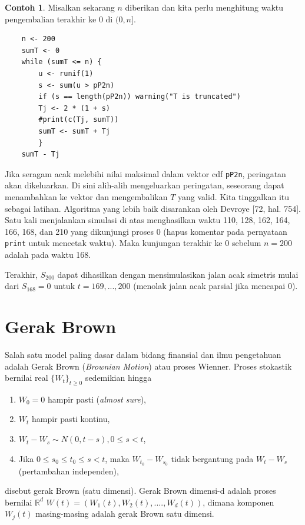 \documentclass[a4paper,12pt]{article}
\theoremstyle{definition}
\newtheorem{example}{Contoh}[section]
\begin{document}
\begin{example}
Misalkan sekarang $n$ diberikan dan kita perlu menghitung waktu pengembalian terakhir ke 0 di $(0, n]$.

    \begin{lstlisting}
    n <- 200
    sumT <- 0
    while (sumT <= n) {
        u <- runif(1)
        s <- sum(u > pP2n)
        if (s == length(pP2n)) warning("T is truncated")
        Tj <- 2 * (1 + s)
        #print(c(Tj, sumT))
        sumT <- sumT + Tj
        }
    sumT - Tj
    \end{lstlisting}

Jika seragam acak melebihi nilai maksimal dalam vektor cdf \texttt{pP2n}, peringatan akan dikeluarkan. Di sini alih-alih mengeluarkan peringatan, seseorang dapat menambahkan ke vektor dan mengembalikan $T$ yang valid. Kita tinggalkan itu sebagai latihan. Algoritma yang lebih baik disarankan oleh Devroye [72, hal. 754]. Satu kali menjalankan simulasi di atas menghasilkan waktu 110, 128, 162, 164, 166, 168, dan 210 yang dikunjungi proses 0 (hapus komentar pada pernyataan \texttt{print} untuk mencetak waktu). Maka kunjungan terakhir ke 0 sebelum $n = 200$ adalah pada waktu 168.

Terakhir, $S_200$ dapat dihasilkan dengan mensimulasikan jalan acak simetris mulai dari $S_168 = 0$ untuk $t = 169, ..., 200$ (menolak jalan acak parsial jika mencapai 0).

\end{example}







\section{Gerak Brown} %
Salah satu model paling dasar dalam bidang finansial dan ilmu pengetahuan adalah Gerak Brown (\textit{Brownian Motion}) atau proses Wienner. Proses stokastik bernilai real $\{W_t\}_{t\ge 0}$ sedemikian hingga
\begin{enumerate}
    \item $W_0 = 0$ hampir pasti (\textit{almost sure}),
    \item $W_t$ hampir pasti kontinu,
    \item $W_t-W_s\sim N(0,t-s),0\leq s< t$,
    \item Jika $0\leq s_0\leq t_0\leq s<t$, maka $W_{t_0}-W_{s_0}$ tidak bergantung pada $W_t-W_s$ (pertambahan independen),
\end{enumerate}
disebut gerak Brown (satu dimensi). Gerak Brown dimensi-d adalah proses bernilai $\mathbb{R}^{d}$ $W(t)=(W_1(t),W_2(t),....,W_d(t))$, dimana komponen $W_j(t)$ masing-masing adalah gerak Brown satu dimensi.
\end{document}
